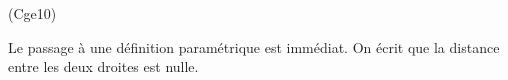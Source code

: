 \begin{tiny}(Cge10)\end{tiny} Le passage à une définition paramétrique est immédiat. On écrit que la distance entre les deux droites est nulle.